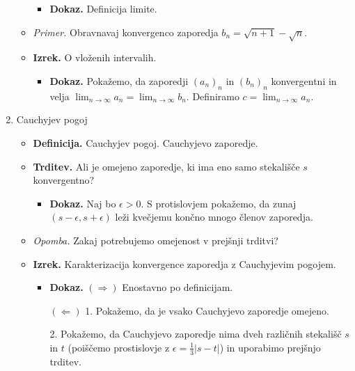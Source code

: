 \begin{enumerate}
\begin{itemize}
        \begin{itemize}
            \item \colorbox{green!30}{\textbf{Dokaz.}} Definicija limite.
        \end{itemize}
        \item \colorbox{yellow!30}{\emph{Primer.}} Obravnavaj konvergenco zaporedja $b_n = \sqrt{n+1} - \sqrt{n}$.
        \item \colorbox{blue!30}{\textbf{Izrek.}} O vloženih intervalih.
        \begin{itemize}
            \item  \colorbox{green!30}{\textbf{Dokaz.}} Pokažemo, da zaporedji $(a_n)_n$ in $(b_n)_n$ konvergentni in velja $\lim_{n \to \infty} a_n = \lim_{n \to \infty} b_n$. Definiramo $c = \lim_{n \to \infty} a_n$.
        \end{itemize}
    \end{itemize}

    
    \item Cauchyjev pogoj
    \begin{itemize}
        \item \colorbox{purple!30}{\textbf{Definicija.}} Cauchyjev pogoj. Cauchyjevo zaporedje.
        \item \colorbox{blue!30}{\textbf{Trditev.}}  Ali je omejeno zaporedje, ki ima eno samo stekališče $s$ konvergentno?
        \begin{itemize}
            \item \colorbox{green!30}{\textbf{Dokaz.}} Naj bo $\epsilon > 0$. S protislovjem pokažemo, da zunaj $(s-\epsilon, s+\epsilon)$ leži kvečjemu končno mnogo členov zaporedja.
        \end{itemize}
        \item \colorbox{yellow!30}{\emph{Opomba.}} Zakaj potrebujemo omejenost v prejšnji trditvi?
        \item \colorbox{blue!30}{\textbf{Izrek.}} Karakterizacija konvergence zaporedja z Cauchyjevim pogojem.
        \begin{itemize}
            \item \colorbox{green!30}{\textbf{Dokaz.}} $(\Rightarrow)$ Enostavno po definicijam.
            
            $(\Leftarrow)$ 1. Pokažemo, da je vsako Cauchyjevo zaporedje omejeno.

            2. Pokažemo, da Cauchyjevo zaporedje nima dveh različnih stekališč $s$ in $t$ (poiščemo prostislovje z $\epsilon = \frac{1}{3}|s-t|$) in uporabimo prejšnjo trditev.
        \end{itemize}  
    \end{itemize}


\end{enumerate}

